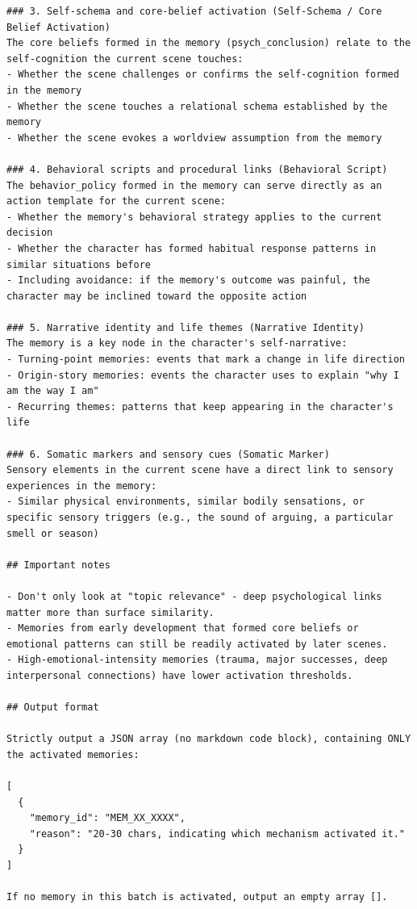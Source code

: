 \begin{tcolorbox}[
  breakable,
  colback=blue!5,
  colframe=blue!60!black,
  title={\textbf{Stage 1 — Memory Activation Screening Prompt}},
  fonttitle=\bfseries,
  rounded corners,
  boxrule=1.0pt
]
\begin{Verbatim}[fontsize=\scriptsize, breaklines=true, breaksymbolleft={}, breaksymbolright={}, breakindent=1em]
### 3. Self-schema and core-belief activation (Self-Schema / Core Belief Activation)
The core beliefs formed in the memory (psych_conclusion) relate to the self-cognition the current scene touches:
- Whether the scene challenges or confirms the self-cognition formed in the memory
- Whether the scene touches a relational schema established by the memory
- Whether the scene evokes a worldview assumption from the memory

### 4. Behavioral scripts and procedural links (Behavioral Script)
The behavior_policy formed in the memory can serve directly as an action template for the current scene:
- Whether the memory's behavioral strategy applies to the current decision
- Whether the character has formed habitual response patterns in similar situations before
- Including avoidance: if the memory's outcome was painful, the character may be inclined toward the opposite action

### 5. Narrative identity and life themes (Narrative Identity)
The memory is a key node in the character's self-narrative:
- Turning-point memories: events that mark a change in life direction
- Origin-story memories: events the character uses to explain "why I am the way I am"
- Recurring themes: patterns that keep appearing in the character's life

### 6. Somatic markers and sensory cues (Somatic Marker)
Sensory elements in the current scene have a direct link to sensory experiences in the memory:
- Similar physical environments, similar bodily sensations, or specific sensory triggers (e.g., the sound of arguing, a particular smell or season)

## Important notes

- Don't only look at "topic relevance" - deep psychological links matter more than surface similarity.
- Memories from early development that formed core beliefs or emotional patterns can still be readily activated by later scenes.
- High-emotional-intensity memories (trauma, major successes, deep interpersonal connections) have lower activation thresholds.

## Output format

Strictly output a JSON array (no markdown code block), containing ONLY the activated memories:

[
  {
    "memory_id": "MEM_XX_XXXX",
    "reason": "20-30 chars, indicating which mechanism activated it."
  }
]

If no memory in this batch is activated, output an empty array [].


\end{Verbatim}
\end{tcolorbox}

